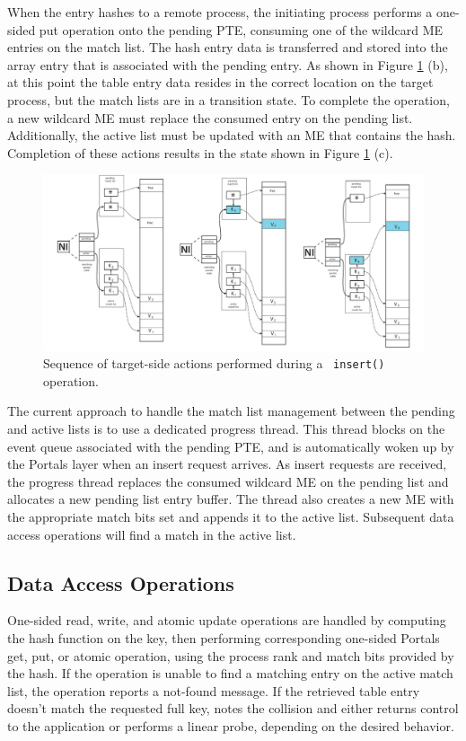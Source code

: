 When the entry hashes to a remote process, the initiating process
performs a one-sided put operation onto the pending PTE, consuming one
of the wildcard ME entries on the match list. The hash entry data is
transferred and stored into the array entry that is associated with
the pending entry. As shown in Figure \ref{fig:put} (b), at this point
the table entry data resides in the correct location on the target
process, but the match lists are in a transition state.  To complete the
operation, a new wildcard ME must replace the consumed entry on the
pending list. Additionally, the active list must be updated with an ME
that contains the hash. Completion of these actions results in the state shown
in Figure \ref{fig:put} (c).

\begin{figure}
  \centering
  \includegraphics[width=\linewidth]{figs/put}
  \caption{Sequence of target-side actions performed during a \pdht~{\tt insert()} operation.}
  \label{fig:put}
\end{figure}

The current approach to handle the match list management between the
pending and active lists is to use a dedicated progress thread. This
thread blocks on the event queue associated with the pending PTE,
and is automatically woken up by the Portals layer when an insert request
arrives. As insert requests are received, the
progress thread replaces the consumed wildcard ME on the pending list and allocates a
new pending list entry buffer. The thread also creates a new
ME with the appropriate match bits set and appends it to the active
list. Subsequent data access operations will find a match in the active list.

\subsection{Data Access Operations}

One-sided read, write, and atomic update operations are handled by computing
the hash function on the key, then performing corresponding one-sided Portals
get, put, or atomic operation, using the process rank and
match bits provided by the hash. If the operation is unable to
find a matching entry on the active match list, the operation reports
a not-found message. If the retrieved table entry doesn't match the
requested full key, \pdht notes the collision and either returns
control to the application or performs a linear probe, depending on
the desired behavior.

